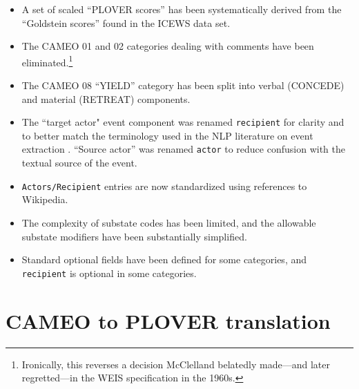 \documentclass[11pt]{report}
\newcommand{\plcat}[1]{\textsf{#1}}
\newcommand{\txt}[1]{\texttt{#1}}
\newcommand{\fn}[1]{\footnote{#1}}
\begin{document}
{\begin{itemize}
\item A set of scaled ``PLOVER scores'' has been systematically derived from the ``Goldstein scores'' found in the ICEWS data set.

\item The CAMEO 01 and 02 categories dealing with comments have been eliminated.\fn{Ironically, this reverses a decision McClelland belatedly made---and later regretted---in the WEIS specification in the 1960s.}

\item The CAMEO 08 ``YIELD'' category has been split into verbal (\plcat{CONCEDE}) and material (\plcat{RETREAT}) components.

\item The ``target actor" event component was renamed \txt{recipient} for clarity and to better match the terminology used in the NLP literature on event extraction \citep{halterman2020extracting}. ``Source actor'' was renamed \txt{actor} to reduce confusion with the textual source of the event.

\item \texttt{Actors/Recipient} entries are now standardized using references to Wikipedia.

\item The complexity of substate codes has been limited, and the allowable substate modifiers have been substantially simplified.

\item Standard optional fields have been defined for some categories, and \txt{recipient} is optional in some categories.

\end{itemize}


\section{CAMEO to PLOVER translation}\label{ssec:ctp}

}
\end{document}
